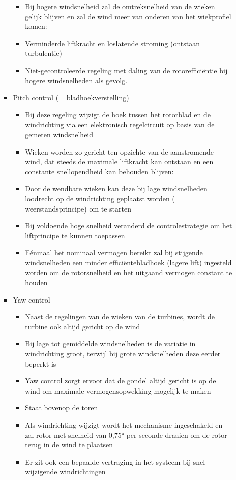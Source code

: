 \documentclass[12pt]{article}
\begin{document}
\begin{itemize}
\begin{itemize}
\begin{itemize}
\begin{itemize}
                \item Bij hogere windsnelheid zal de omtreksnelheid van de wieken gelijk blijven en zal de wind meer van onderen van het wiekprofiel komen:
                \item[] Verminderde liftkracht en loslatende stroming (ontstaan turbulentie)
                \item[] Niet-gecontroleerde regeling met daling van de rotorefficiëntie bij hogere windsnelheden als gevolg.
            \end{itemize}
            \item Pitch control (= bladhoekverstelling)\begin{itemize}
                \item Bij deze regeling wijzigt de hoek tussen het rotorblad en de windrichting via een elektronisch regelcircuit op basis van de gemeten windsnelheid
                \item Wieken worden zo gericht ten opzichte van de aanstromende wind, dat steeds de maximale liftkracht kan ontstaan en een constante snellopendheid kan behouden blijven:
                \item[] Door de wendbare wieken kan deze bij lage windsnelheden loodrecht op de windrichting geplaatst worden (= weerstandsprincipe) om te starten
                \item[] Bij voldoende hoge snelheid veranderd de controlestrategie om het liftprincipe te kunnen toepassen
                \item[] Eénmaal het nominaal vermogen bereikt zal bij stijgende windsnelheden een minder efficiëntebladhoek (lagere lift) ingesteld worden om de rotorsnelheid en het uitgaand vermogen constant te houden
            \end{itemize}
            \item Yaw control\begin{itemize}
                \item Naast de regelingen van de wieken van de turbines, wordt de turbine ook altijd gericht op de wind
                \item Bij lage tot gemiddelde windsnelheden is de variatie in windrichting groot, terwijl bij grote windsnelheden deze eerder beperkt is
                \item Yaw control zorgt ervoor dat de gondel altijd gericht is op de wind om maximale vermogensopwekking mogelijk te maken
                \item Staat bovenop de toren
                \item Als windrichting wijzigt wordt het mechanisme ingeschakeld en zal rotor
                met snelheid van 0,75° per seconde draaien om de rotor terug in de
                wind te plaatsen
                \item Er zit ook een bepaalde vertraging in het systeem bij snel wijzigende
                windrichtingen
            \end{itemize}
        \end{itemize}
    \end{itemize}
\end{itemize}
\end{document}
